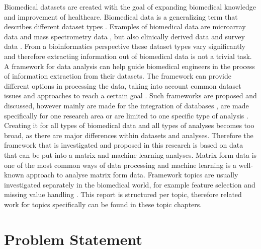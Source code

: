 \documentclass[10pt,a4paper]{report}
\begin{document}
	Biomedical datasets are created with the goal of expanding biomedical knowledge and improvement of healthcare. Biomedical data is a generalizing term that describes different dataset types \cite{gehlenborg2010visualization}. Examples of biomedical data are microarray data \cite{brazma2001minimum} and mass spectrometry data \cite{cottrell1999probability, dettmer2007mass}, but also clinically derived data \cite{liu2012data, sittig2008grand} and survey data \cite{magni1990chronic}. From a bioinformatics perspective these dataset types vary significantly \cite{gehlenborg2010visualization} and therefore extracting information out of biomedical data is not a trivial task. A framework for data analysis can help guide biomedical engineers in the process of information extraction from their datasets. The framework can provide different options in processing the data, taking into account common dataset issues \cite{bertolazzi2008logic, piatetsky2003microarray,lommen2009metalign} and approaches to reach a certain goal \cite{holzinger2014knowledge, wilkins2009proteomics}. Such frameworks are proposed and discussed, however mainly are made for the integration of databases \cite{teodoro2009biomedical, doi:10.1093/nar/gkm1037}, are made specifically for one research area \cite{sturn2002genesis, karnovsky2011metscape, tabas2012genecodis3} or are limited to one specific type of analysis \cite{faul2007g}. 
	Creating it for all types of biomedical data and all types of analyses becomes too broad, as there are major differences within datasets and analyses. Therefore the framework that is investigated and proposed in this research is based on data that can be put into a matrix and machine learning analyses. Matrix form data is one of the most common ways of data processing and machine learning is a well-known approach to analyse matrix form data.
	Framework topics are usually investigated separately in the biomedical world, for example feature selection \cite{baumgartner2006data, welthagen2005comprehensive} and missing value handling \cite{donders2006gentle, cartwright2003dealing, haukoos2007advanced}. This report is structured per topic, therefore related work for topics specifically can be found in these topic chapters.
	
	\section{Problem Statement}
	\label{IDsec:ProblemStatement}
	
\end{document}
